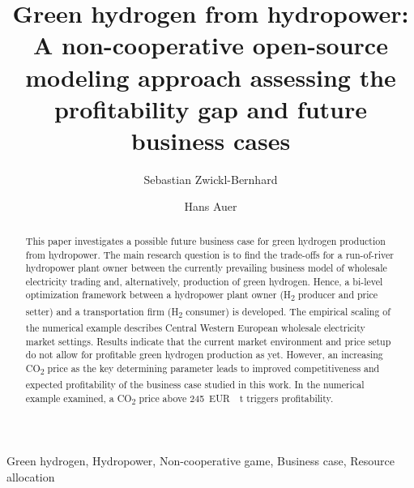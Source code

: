 \documentclass[review]{elsarticle}
\begin{document}
\begin{frontmatter}

\title{Green hydrogen from hydropower: A non-cooperative open-source modeling approach assessing the profitability gap and future business cases}
\author[1]{Sebastian Zwickl-Bernhard}
\author[1]{Hans Auer}
\address[1]{Energy Economics Group (EEG), Technische Universität Wien, Gusshausstrasse 25-29/E370-3, 1040 Wien, Austria}


\begin{abstract}
This paper investigates a possible future business case for green hydrogen production from hydropower. The main research question is to find the trade-offs for a run-of-river hydropower plant owner between the currently prevailing business model of wholesale electricity trading and, alternatively, production of green hydrogen. Hence, a bi-level optimization framework between a hydropower plant owner (H\textsubscript{2} producer and price setter) and a transportation firm (H\textsubscript{2} consumer) is developed. The empirical scaling of the numerical example describes Central Western European wholesale electricity market settings. Results indicate that the current market environment and price setup do not allow for profitable green hydrogen production as yet. However, an increasing CO\textsubscript{2} price as the key determining parameter leads to improved competitiveness and expected profitability of the business case studied in this work. In the numerical example examined, a CO\textsubscript{2} price above \SI{245}{EUR \per \tonne} triggers profitability.
\end{abstract}


\begin{keyword}
Green hydrogen, Hydropower, Non-cooperative game, Business case, Resource allocation
\end{keyword}

\end{frontmatter}
\end{document}
